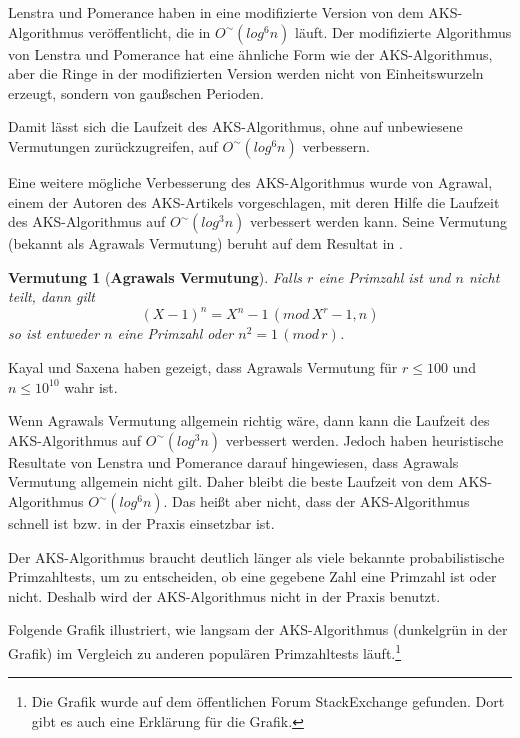 \documentclass[12pt,oneside]{article}
\newtheorem{conj}[theorem]{Vermutung}
\theoremstyle{remark}
\theoremstyle{definition}
\begin{document}
Lenstra und Pomerance haben in \cite{lenstra-pomerance} eine modifizierte Version von dem AKS-Algorithmus veröffentlicht, die in $O^{\sim}(log^6 n)$ läuft. Der modifizierte Algorithmus von Lenstra und Pomerance hat eine ähnliche Form wie der AKS-Algorithmus, aber die Ringe in der modifizierten Version werden nicht von Einheitswurzeln erzeugt, sondern von gaußschen Perioden.\newline

Damit lässt sich die Laufzeit des AKS-Algorithmus, ohne auf unbewiesene Vermutungen zurückzugreifen, auf $O^{\sim}(log^6 n)$ verbessern.

Eine weitere mögliche Verbesserung des AKS-Algorithmus wurde von Agrawal, einem der Autoren des AKS-Artikels vorgeschlagen, mit deren Hilfe die Laufzeit des AKS-Algorithmus auf $O^{\sim}(log^3n)$ verbessert werden kann. Seine Vermutung (bekannt als Agrawals Vermutung) beruht auf dem Resultat in \cite{bhattc-pandey}.

\begin{conj}[\textbf{Agrawals Vermutung}]\label{agrawals-conj}
Falls $r$ eine Primzahl ist und $n$ nicht teilt, dann gilt
\begin{equation}
    (X - 1)^n = X^n - 1\, (mod \, X^{r} - 1,n)
\end{equation}
so ist entweder $n$ eine Primzahl oder $n^2 = 1 \,( mod \, r)$.
\end{conj}
Kayal und Saxena \cite{kayal-saxena} haben gezeigt, dass Agrawals Vermutung für $r \leq 100$ und $n \leq 10^{10}$ wahr ist.

Wenn Agrawals Vermutung allgemein richtig wäre, dann kann die Laufzeit des AKS-Algorithmus auf $O^{\sim}(log^3 n)$ verbessert werden. Jedoch haben heuristische Resultate von Lenstra und Pomerance darauf hingewiesen, dass Agrawals Vermutung allgemein nicht gilt\cite{aks}. Daher bleibt die beste Laufzeit von dem AKS-Algorithmus $O^{\sim}(log^6n)$. Das heißt aber nicht, dass der AKS-Algorithmus schnell ist bzw. in der Praxis einsetzbar ist.\newline


Der AKS-Algorithmus braucht deutlich länger als viele bekannte probabilistische Primzahltests, um zu entscheiden, ob eine gegebene Zahl eine Primzahl ist oder nicht. Deshalb wird der AKS-Algorithmus nicht in der Praxis benutzt. 

Folgende Grafik illustriert, wie langsam der AKS-Algorithmus (dunkelgrün in der Grafik) im Vergleich zu anderen populären Primzahltests läuft\cite{comparison}.\footnote{Die Grafik wurde auf dem öffentlichen Forum StackExchange gefunden. Dort gibt es auch eine Erklärung für die Grafik.}
\end{document}
